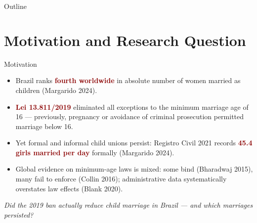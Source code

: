 \documentclass[aspectratio=169,10pt]{beamer}
\newcommand{\hl}[1]{\textcolor{darkred}{\textbf{#1}}}
\begin{document}
\begin{frame}{Outline}
    \tableofcontents
\end{frame}

\section{Motivation and Research Question}

\begin{frame}{Motivation}
    \begin{itemize}
        \item Brazil ranks \hl{fourth worldwide} in absolute number of women married as children (Margarido 2024).
        \item \hl{Lei 13.811/2019} eliminated all exceptions to the minimum marriage age of 16 --- previously, pregnancy or avoidance of criminal prosecution permitted marriage below 16.
        \item Yet formal and informal child unions persist: Registro Civil 2021 records \hl{45.4 girls married per day} formally (Margarido 2024).
        \item Global evidence on minimum-age laws is mixed: some bind (Bharadwaj 2015), many fail to enforce (Collin 2016); administrative data systematically overstates law effects (Blank 2020).
    \end{itemize}
    \vspace{0.3cm}
    \centering
    \textit{Did the 2019 ban actually reduce child marriage in Brazil --- and which marriages persisted?}
\end{frame}
\end{document}
